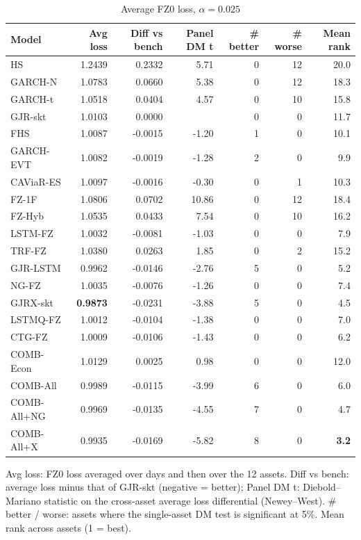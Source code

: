 \begin{table}[htbp]
\centering
\footnotesize
\caption{Average FZ0 loss, $\alpha=0.025$}
\label{tab:loss_a025}
\begin{tabular}{lrrrrrr}
\toprule
Model & Avg loss & Diff vs bench & Panel DM t & \# better & \# worse & Mean rank \\
\midrule
HS & 1.2439 & 0.2332 & 5.71 & 0 & 12 & 20.0 \\
GARCH-N & 1.0783 & 0.0660 & 5.38 & 0 & 12 & 18.3 \\
GARCH-t & 1.0518 & 0.0404 & 4.57 & 0 & 10 & 15.8 \\
GJR-skt & 1.0103 & 0.0000 &  & 0 & 0 & 11.7 \\
FHS & 1.0087 & -0.0015 & -1.20 & 1 & 0 & 10.1 \\
GARCH-EVT & 1.0082 & -0.0019 & -1.28 & 2 & 0 & 9.9 \\
CAViaR-ES & 1.0097 & -0.0016 & -0.30 & 0 & 1 & 10.3 \\
FZ-1F & 1.0806 & 0.0702 & 10.86 & 0 & 12 & 18.4 \\
FZ-Hyb & 1.0535 & 0.0433 & 7.54 & 0 & 10 & 16.2 \\
LSTM-FZ & 1.0032 & -0.0081 & -1.03 & 0 & 0 & 7.9 \\
TRF-FZ & 1.0380 & 0.0263 & 1.85 & 0 & 2 & 15.2 \\
GJR-LSTM & 0.9962 & -0.0146 & -2.76 & 5 & 0 & 5.2 \\
NG-FZ & 1.0035 & -0.0076 & -1.26 & 0 & 0 & 7.4 \\
GJRX-skt & \textbf{0.9873} & -0.0231 & -3.88 & 5 & 0 & 4.5 \\
LSTMQ-FZ & 1.0012 & -0.0104 & -1.38 & 0 & 0 & 7.0 \\
CTG-FZ & 1.0009 & -0.0106 & -1.43 & 0 & 0 & 6.2 \\
COMB-Econ & 1.0129 & 0.0025 & 0.98 & 0 & 0 & 12.0 \\
COMB-All & 0.9989 & -0.0115 & -3.99 & 6 & 0 & 6.0 \\
COMB-All+NG & 0.9969 & -0.0135 & -4.55 & 7 & 0 & 4.7 \\
COMB-All+X & 0.9935 & -0.0169 & -5.82 & 8 & 0 & \textbf{3.2} \\
\bottomrule
\end{tabular}
\par\smallskip\parbox{\linewidth}{\scriptsize Avg loss: FZ0 loss averaged over days and then over the 12 assets. Diff vs bench: average loss minus that of GJR-skt (negative = better); Panel DM t: Diebold--Mariano statistic on the cross-asset average loss differential (Newey--West). \# better / worse: assets where the single-asset DM test is significant at 5\%. Mean rank across assets (1 = best).}
\end{table}